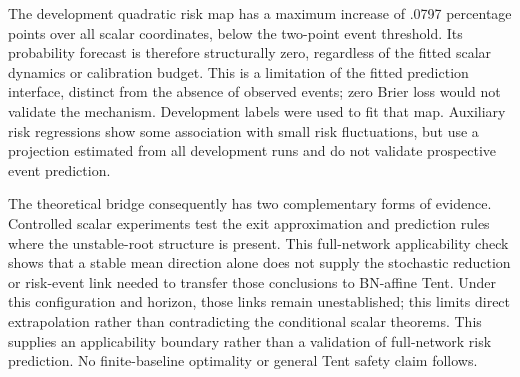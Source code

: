 The development quadratic risk map has a maximum increase of .0797 percentage points over all scalar coordinates, below the two-point event threshold. Its probability forecast is therefore structurally zero, regardless of the fitted scalar dynamics or calibration budget. This is a limitation of the fitted prediction interface, distinct from the absence of observed events; zero Brier loss would not validate the mechanism. Development labels were used to fit that map. Auxiliary risk regressions show some association with small risk fluctuations, but use a projection estimated from all development runs and do not validate prospective event prediction.

The theoretical bridge consequently has two complementary forms of evidence. Controlled scalar experiments test the exit approximation and prediction rules where the unstable-root structure is present. This full-network applicability check shows that a stable mean direction alone does not supply the stochastic reduction or risk-event link needed to transfer those conclusions to BN-affine Tent. Under this configuration and horizon, those links remain unestablished; this limits direct extrapolation rather than contradicting the conditional scalar theorems. This supplies an applicability boundary rather than a validation of full-network risk prediction. No finite-baseline optimality or general Tent safety claim follows.
